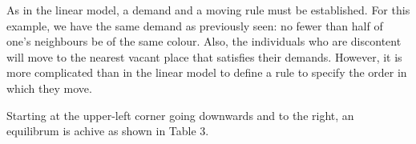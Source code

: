 \documentclass[../main.tex]{subfiles}
\begin{document}
As in the linear model, a demand and a moving rule must be established. For this example, we have the same demand as previously seen: no fewer than half of one's neighbours be of the same colour. Also, the individuals who are discontent will move to the nearest vacant place that satisfies their demands. However, it is more complicated than in the linear model to define a rule to specify the order in which they move.

Starting at the upper-left corner going downwards and to the right, an equilibrum is achive as shown in Table 3. 

\begin{table}[H]
\begin{center}
\end{center}
\caption{Stable segregation - moving left-to-right, up-down} 
\end{table}
\end{document}
